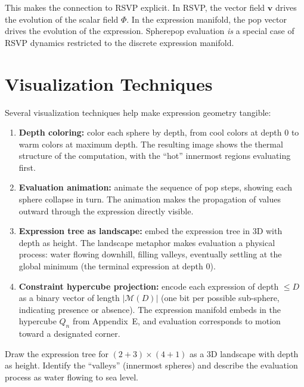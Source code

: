 \begin{remark}
  This makes the connection to RSVP explicit. In RSVP, the vector field
  $\mathbf{v}$ drives the evolution of the scalar field $\Phi$. In the
  expression manifold, the pop vector drives the evolution of the
  expression. Spherepop evaluation \emph{is} a special case of RSVP
  dynamics restricted to the discrete expression manifold.
\end{remark}

\section{Visualization Techniques}

Several visualization techniques help make expression geometry tangible:

\begin{enumerate}
  \item \textbf{Depth coloring:} color each sphere by depth, from
        cool colors at depth 0 to warm colors at maximum depth.
        The resulting image shows the thermal structure of the
        computation, with the ``hot'' innermost regions evaluating first.

  \item \textbf{Evaluation animation:} animate the sequence of pop
        steps, showing each sphere collapse in turn. The animation
        makes the propagation of values outward through the expression
        directly visible.

  \item \textbf{Expression tree as landscape:} embed the expression
        tree in 3D with depth as height. The landscape metaphor makes
        evaluation a physical process: water flowing downhill, filling
        valleys, eventually settling at the global minimum (the terminal
        expression at depth 0).

  \item \textbf{Constraint hypercube projection:} encode each expression
        of depth $\leq D$ as a binary vector of length $|\mathcal{M}(D)|$
        (one bit per possible sub-sphere, indicating presence or absence).
        The expression manifold embeds in the hypercube $Q_n$ from
        Appendix~E, and evaluation corresponds to motion toward a
        designated corner.
\end{enumerate}

\begin{exercise}
  Draw the expression tree for $(2 + 3) \times (4 + 1)$ as a
  3D landscape with depth as height. Identify the ``valleys''
  (innermost spheres) and describe the evaluation process as
  water flowing to sea level.
\end{exercise}

